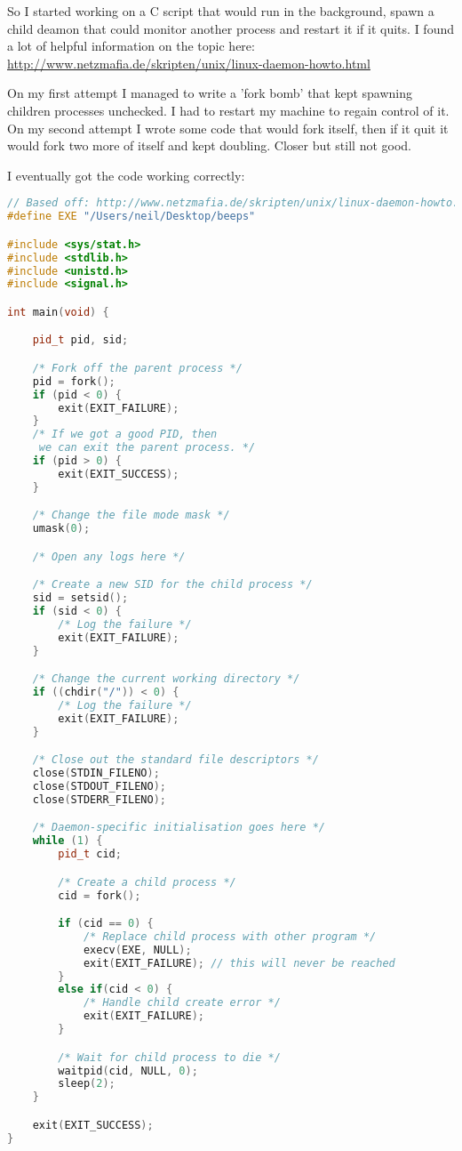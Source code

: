 So I started working on a C script that would run in the background, spawn a child deamon that could monitor another process and restart it if it quits. I found a lot of helpful information on the topic here: \url{http://www.netzmafia.de/skripten/unix/linux-daemon-howto.html}

On my first attempt I managed to write a 'fork bomb' that kept spawning children processes unchecked. I had to restart my machine to regain control of it. On my second attempt I wrote some code that would fork itself, then if it quit it would fork two more of itself and kept doubling. Closer but still not good.

I eventually got the code working correctly:

\begin{lstlisting}[language=C++,caption=daemon.c]
// Based off: http://www.netzmafia.de/skripten/unix/linux-daemon-howto.html
#define EXE "/Users/neil/Desktop/beeps"

#include <sys/stat.h>
#include <stdlib.h>
#include <unistd.h>
#include <signal.h>

int main(void) {

    pid_t pid, sid;

    /* Fork off the parent process */
    pid = fork();
    if (pid < 0) {
        exit(EXIT_FAILURE);
    }
    /* If we got a good PID, then
     we can exit the parent process. */
    if (pid > 0) {
        exit(EXIT_SUCCESS);
    }

    /* Change the file mode mask */
    umask(0);

    /* Open any logs here */

    /* Create a new SID for the child process */
    sid = setsid();
    if (sid < 0) {
        /* Log the failure */
        exit(EXIT_FAILURE);
    }

    /* Change the current working directory */
    if ((chdir("/")) < 0) {
        /* Log the failure */
        exit(EXIT_FAILURE);
    }

    /* Close out the standard file descriptors */
    close(STDIN_FILENO);
    close(STDOUT_FILENO);
    close(STDERR_FILENO);

    /* Daemon-specific initialisation goes here */
    while (1) {
        pid_t cid;

        /* Create a child process */
        cid = fork();

        if (cid == 0) {
            /* Replace child process with other program */
            execv(EXE, NULL);
            exit(EXIT_FAILURE); // this will never be reached
        }
        else if(cid < 0) {
            /* Handle child create error */
            exit(EXIT_FAILURE);
        }

        /* Wait for child process to die */
        waitpid(cid, NULL, 0);
        sleep(2);
    }

    exit(EXIT_SUCCESS);
}
\end{lstlisting}

